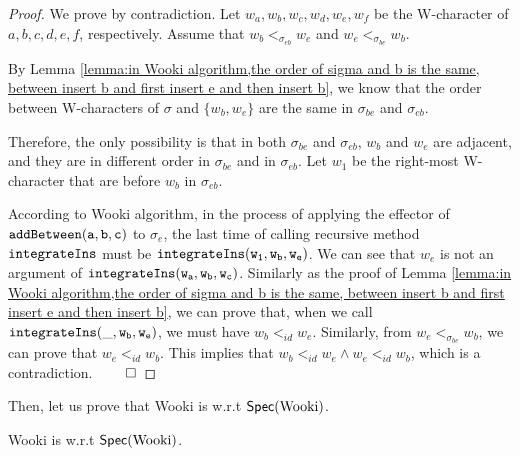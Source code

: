 \begin {proof}
We prove by contradiction. Let $w_a,w_b,w_c,w_d,w_e,w_f$ be the W-character of $a,b,c,d,e,f$, respectively. Assume that $w_b <_{\sigma_{eb}} w_e$ and $w_e <_{\sigma_{be}} w_b$.

By Lemma \ref{lemma:in Wooki algorithm,the order of sigma and b is the same, between insert b and first insert e and then insert b}, we know that the order between W-characters of $\sigma$ and $\{ w_b,w_e \}$ are the same in $\sigma_{be}$ and $\sigma_{eb}$.

Therefore, the only possibility is that in both $\sigma_{be}$ and $\sigma_{eb}$, $w_b$ and $w_e$ are adjacent, and they are in different order in $\sigma_{be}$ and in $\sigma_{eb}$. Let $w_1$ be the right-most W-character that are before $w_b$ in $\sigma_{eb}$.

According to Wooki algorithm, in the process of applying the effector of $\alabelshort[{\tt addBetween}]{a,b,c}$ to $\sigma_e$, the last time of calling recursive method ${\tt integrateIns}$ must be $\alabelshort[{\tt integrateIns}]{w_1,w_b,w_e}$. %
We can see that $w_e$ is not an argument of $\alabelshort[{\tt integrateIns}]{w_a,w_b,w_c}$. Similarly as the proof of Lemma \ref{lemma:in Wooki algorithm,the order of sigma and b is the same, between insert b and first insert e and then insert b}, we can prove that, when we call $\alabelshort[{\tt integrateIns}]{\_,w_b,w_e}$, we must have $w_b <_{id} w_e$. Similarly, from $w_e <_{\sigma_{be}} w_b$, we can prove that $w_e <_{id} w_b$. This implies that $w_b <_{id} w_e \wedge w_e <_{id} w_b$, which is a contradiction. $\qed$
\end {proof}



Then, let us prove that Wooki is \crdtlinearizable{} w.r.t $\mathsf{Spec}(\text{Wooki})$.

\begin{lemma}
\label{lemma:Wooki is correct}
Wooki is \crdtlinearizable{} w.r.t $\mathsf{Spec}(\text{Wooki})$.
\end{lemma}

